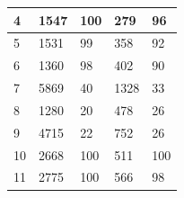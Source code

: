 \documentclass[journal, twoside]{IEEEtran}
\begin{document}
\begin{table}[ht]
\begin{tabular}{|l|l|l|l|l|}
4                                                        & 1547                                                      & 100                                                                 & 279                                                        & 96                                                                  \\ \hline
5                                                        & 1531                                                      & 99                                                                  & 358                                                        & 92                                                                  \\ \hline
6                                                        & 1360                                                      & 98                                                                  & 402                                                        & 90                                                                  \\ \hline
7                                                        & 5869                                                      & 40                                                                  & 1328                                                       & 33                                                                  \\ \hline
8                                                        & 1280                                                      & 20                                                                  & 478                                                        & 26                                                                  \\ \hline
9                                                        & 4715                                                      & 22                                                                  & 752                                                        & 26                                                                  \\ \hline
10                                                       & 2668                                                      & 100                                                                 & 511                                                        & 100                                                                 \\ \hline
11                                                       & 2775                                                      & 100                                                                 & 566                                                        & 98                                                                  \\ \hline
\end{tabular}
    
\end{table}
\end{document}
